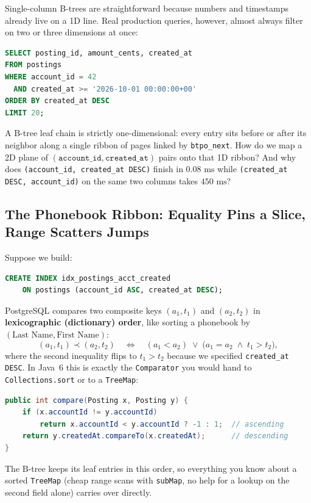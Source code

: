 Single-column B-trees are straightforward because numbers and timestamps already live on a 1D line. Real production queries, however, almost always filter on two or three dimensions at once:
\begin{lstlisting}[language=SQL]
SELECT posting_id, amount_cents, created_at
FROM postings
WHERE account_id = 42
  AND created_at >= '2026-10-01 00:00:00+00'
ORDER BY created_at DESC
LIMIT 20;
\end{lstlisting}
A B-tree leaf chain is strictly one-dimensional: every entry sits before or after its neighbor along a single ribbon of pages linked by \texttt{btpo\_next}. How do we map a 2D plane of $(\texttt{account\_id}, \texttt{created\_at})$ pairs onto that 1D ribbon? And why does \texttt{(account\_id, created\_at DESC)} finish in $0.08\text{ ms}$ while \texttt{(created\_at DESC, account\_id)} on the same two columns takes $450\text{ ms}$?

\subsection{The Phonebook Ribbon: Equality Pins a Slice, Range Scatters Jumps}

Suppose we build:
\begin{lstlisting}[language=SQL]
CREATE INDEX idx_postings_acct_created
    ON postings (account_id ASC, created_at DESC);
\end{lstlisting}
PostgreSQL compares two composite keys $(a_1, t_1)$ and $(a_2, t_2)$ in \textbf{lexicographic (dictionary) order}, like sorting a phonebook by $(\text{Last Name}, \text{First Name})$:
\[
  (a_1, t_1) \prec (a_2, t_2)
  \quad\Longleftrightarrow\quad
  (a_1 < a_2) \;\lor\; \bigl(a_1 = a_2 \;\land\; t_1 > t_2\bigr),
\]
where the second inequality flips to $t_1 > t_2$ because we specified \texttt{created\_at DESC}. In Java~6 this is exactly the \texttt{Comparator} you would hand to \texttt{Collections.sort} or to a \texttt{TreeMap}:
\begin{lstlisting}[language=Java]
public int compare(Posting x, Posting y) {
    if (x.accountId != y.accountId)
        return x.accountId < y.accountId ? -1 : 1;  // ascending
    return y.createdAt.compareTo(x.createdAt);      // descending
}
\end{lstlisting}
The B-tree keeps its leaf entries in this order, so everything you know about a sorted \texttt{TreeMap} (cheap range scans with \texttt{subMap}, no help for a lookup on the second field alone) carries over directly.

